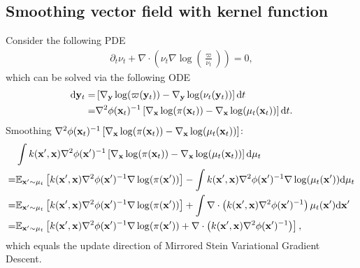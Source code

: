 \subsection{Smoothing vector field with kernel function}
Consider the following PDE
\begin{align}
	\partial_t \nu_t + \nabla\cdot (\nu_t \nabla\log(\frac{\varpi}{\nu_t})) = 0, 
\end{align}
which can be solved via the following ODE
\begin{align*}
	\mathrm{d} \mathbf{y}_t = & \left[\nabla_{\mathbf{y}}\log(\varpi(\mathbf{y}_t)) - \nabla_{\mathbf{y}}\log(\nu_t(\mathbf{y}_t))\right] \mathrm{d} t \\
	 	= & \nabla^2\phi(\mathbf{x}_t)^{-1}\left[\nabla_{\mathbf{x}}\log(\pi(\mathbf{x}_t)) - \nabla_{\mathbf{x}}\log(\mu_t(\mathbf{x}_t))\right]\mathrm{d} t.
\end{align*}
Smoothing $\nabla^2\phi(\mathbf{x}_t)^{-1}\left[\nabla_{\mathbf{x}}\log(\pi(\mathbf{x}_t)) - \nabla_{\mathbf{x}}\log(\mu_t(\mathbf{x}_t))\right]$: 
\begin{align*}
	& \int{k(\mathbf{x}',\mathbf{x})\nabla^2\phi(\mathbf{x}')^{-1}\left[\nabla_{\mathbf{x}}\log(\pi(\mathbf{x}_t)) - \nabla_{\mathbf{x}}\log(\mu_t(\mathbf{x}_t))\right]\mathrm{d}\mu_t} \\ 
	= & \mathbb{E}_{\mathbf{x}'\sim\mu_t}\left[k(\mathbf{x}',\mathbf{x})\nabla^2\phi(\mathbf{x}')^{-1}\nabla\log(\pi(\mathbf{x}'))\right] - \int{k(\mathbf{x}',\mathbf{x})\nabla^2\phi(\mathbf{x}')^{-1}\nabla\log(\mu_t(\mathbf{x}'))\mathrm{d}\mu_t} \\ 
	= & \mathbb{E}_{\mathbf{x}'\sim\mu_t}\left[k(\mathbf{x}',\mathbf{x})\nabla^2\phi(\mathbf{x}')^{-1}\nabla\log(\pi(\mathbf{x}'))\right] + \int{\nabla\cdot\left(k(\mathbf{x}',\mathbf{x})\nabla^2\phi(\mathbf{x}')^{-1}\right)\mu_t(\mathbf{x}')\mathrm{d}\mathbf{x}'}\\
	= & \mathbb{E}_{\mathbf{x}'\sim\mu_t}\left[k(\mathbf{x}',\mathbf{x})\nabla^2\phi(\mathbf{x}')^{-1}\nabla\log(\pi(\mathbf{x}')) + \nabla\cdot\left(k(\mathbf{x}',\mathbf{x})\nabla^2\phi(\mathbf{x}')^{-1}\right) \right], 
\end{align*}
which equals the update direction of Mirrored Stein Variational Gradient Descent.